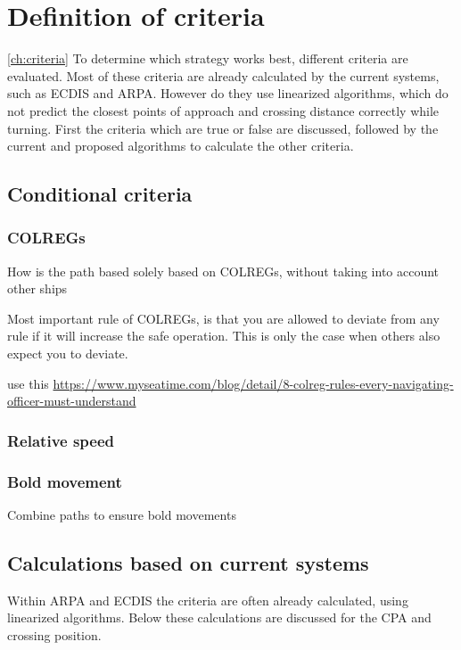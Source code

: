 \chapter{Definition of criteria}
\ref{ch:criteria}
To determine which strategy works best, different criteria are evaluated. Most of these criteria are already calculated by the current systems, such as \ac{ECDIS} and \ac{ARPA}. However do they use linearized algorithms, which do not predict the closest points of approach and crossing distance correctly while turning. First the criteria which are true or false are discussed, followed by the current and proposed algorithms to calculate the other criteria.

\section{Conditional criteria}

\subsection{COLREGs}
How is the path based solely based on COLREGs, without taking into account other ships

Most important rule of \ac{COLREGs}, is that you are allowed to deviate from any rule if it will increase the safe operation. This is only the case when others also expect you to deviate.

use this \url{https://www.myseatime.com/blog/detail/8-colreg-rules-every-navigating-officer-must-understand}

\subsection{Relative speed}

\subsection{Bold movement}
Combine paths to ensure bold movements


\section{Calculations based on current systems}
Within \ac{ARPA} and \ac{ECDIS} the criteria are often already calculated, using linearized algorithms. Below these calculations are discussed for the \ac{CPA} and crossing position.

